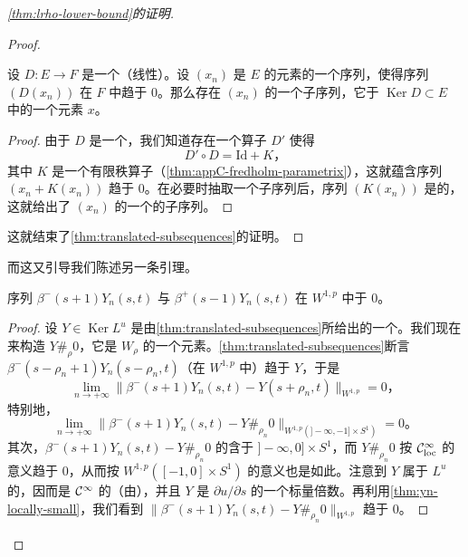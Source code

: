 \begin{proof}[\cref{thm:lrho-lower-bound}的证明]
\begin{proof}
\begin{lemma}\label{thm:fredholm-bounded-sequence}
设 $D\colon E\longrightarrow F$ 是一个（线性）\trFredholmOperator。设 $(x_{n})$ 是 $E$ 的元素的一个\trBounded{}序列，使得序列 $(D(x_{n}))$ 在 $F$ 中趋于 $0$。那么存在 $(x_{n})$ 的一个子序列，它\trConvergence{}于 $\operatorname{Ker}D\subset E$ 中的一个元素 $x$。
\end{lemma}

\begin{proof}
由于 $D$ 是一个\trFredholmOperator，我们知道存在一个算子 $D'$ 使得
\[
D'\circ D=\mathrm{Id}+K\text{，}
\]
其中 $K$ 是一个有限秩算子（\cref{thm:appC-fredholm-parametrix}），这就蕴含序列 $(x_{n}+K(x_{n}))$ 趋于 $0$。在必要时抽取一个子序列后，序列 $(K(x_{n}))$ 是\trConvergence{}的，这就给出了 $(x_{n})$ 的一个\trConvergence{}的子序列。
\end{proof}

这就结束了\cref{thm:translated-subsequences}的证明。
\end{proof}

而这又引导我们陈述另一条引理。

\begin{lemma}\label{thm:beta-translated-null}
序列 $\beta^{-}(s+1)Y_{n}(s,t)$ 与 $\beta^{+}(s-1)Y_{n}(s,t)$ 在 $W^{1,p}$ 中\trConvergence{}于 $0$。
\end{lemma}

\begin{proof}
设 $Y\in\operatorname{Ker}L^{u}$ 是由\cref{thm:translated-subsequences}所给出的一个\trVectorField。我们现在来构造 $Y\#_{\rho}0$，它是 $W_{\rho}$ 的一个元素。\cref{thm:translated-subsequences}断言 $\beta^{-}(s-\rho_{n}+1)Y_{n}(s-\rho_{n},t)$（在 $W^{1,p}$ 中）趋于 $Y$，于是
\[
\lim_{n\to+\infty}\bigl\|\beta^{-}(s+1)Y_{n}(s,t)-Y(s+\rho_{n},t)\bigr\|_{W^{1,p}}=0\text{，}
\]
特别地，
\[
\lim_{n\to+\infty}\bigl\|\beta^{-}(s+1)Y_{n}(s,t)-Y\#_{\rho_{n}}0\bigr\|_{W^{1,p}(]-\infty,-1]\times S^{1})}=0\text{。}
\]
其次，$\beta^{-}(s+1)Y_{n}(s,t)-Y\#_{\rho_{n}}0$ 的\trSupport{}含于 $]-\infty,0]\times S^{1}$，而 $Y\#_{\rho_{n}}0$ 按 $\mathcal{C}^{\infty}_{\mathrm{loc}}$ 的意义趋于 $0$，从而按 $W^{1,p}([-1,0]\times S^{1})$ 的意义也是如此。注意到 $Y$ 属于 $L^{u}$ 的\trKernel，因而是 $\mathcal{C}^{\infty}$ 的（由\trEllipticRegularity），并且 $Y$ 是 $\partial u/\partial s$ 的一个标量倍数。再利用\cref{thm:yn-locally-small}，我们看到 $\bigl\|\beta^{-}(s+1)Y_{n}(s,t)-Y\#_{\rho_{n}}0\bigr\|_{W^{1,p}}$ 趋于 $0$。


\end{proof}
\end{proof}
